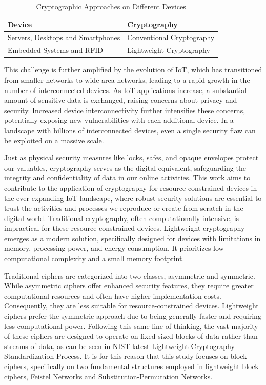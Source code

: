 \documentclass[conference]{IEEEtran}
\begin{document}
\begin{table}[ht]
    \centering
    \caption{Cryptographic Approaches on Different Devices}
    \begin{tabular}{ll}
        \toprule
        \textbf{Device} & \textbf{Cryptography} \\
        \midrule
        Servers, Desktops and Smartphones & Conventional Cryptography \\
        Embedded Systems and RFID & Lightweight Cryptography \\
        \bottomrule
    \end{tabular}
    \label{table:crypto_devices}
\end{table}

This challenge is further amplified by the evolution of IoT, which has transitioned from smaller networks to wide area networks, leading to a rapid growth in the number of interconnected devices. As IoT applications increase, a substantial amount of sensitive data is exchanged, raising concerns about privacy and security. Increased device interconnectivity further intensifies these concerns, potentially exposing new vulnerabilities with each additional device. In a landscape with billions of interconnected devices, even a single security flaw can be exploited on a massive scale.

Just as physical security measures like locks, safes, and opaque envelopes protect our valuables, cryptography serves as the digital equivalent, safeguarding the integrity and confidentiality of data in our online activities. This work aims to contribute to the application of cryptography for resource-constrained devices in the ever-expanding IoT landscape, where robust security solutions are essential to trust the activities and processes we reproduce or create from scratch in the digital world. 
Traditional cryptography, often computationally intensive, is impractical for these resource-constrained devices.  Lightweight cryptography emerges as a modern solution, specifically designed for devices with limitations in memory, processing power, and energy consumption. It prioritizes low computational complexity and a small memory footprint\cite{zhong2024lightweight}.

Traditional ciphers are categorized into two classes, asymmetric and symmetric. While asymmetric ciphers offer enhanced security features, they require greater computational resources and often have higher implementation costs. Consequently, they are less suitable for resource-constrained devices. Lightweight ciphers prefer the symmetric approach due to being generally faster and requiring less computational power. Following this same line of thinking, the vast majority of these ciphers are designed to operate on fixed-sized blocks of data rather than streams of data, as can be seen in NIST latest Lightweight Cryptography Standardization Process\cite{NIST}. It is for this reason that this study focuses on block ciphers, specifically on two fundamental structures employed in lightweight block ciphers, Feistel Networks and Substitution-Permutation Networks.
\end{document}
